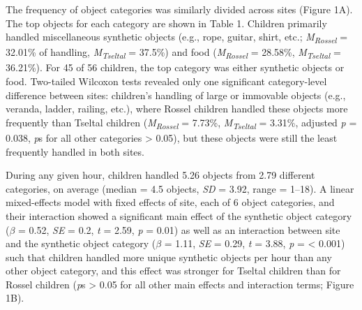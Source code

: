 \documentclass[10pt, letterpaper]{article}
\begin{document}
The frequency of object categories was similarly divided across sites
(Figure 1A). The top objects for each category are shown in Table 1.
Children primarily handled miscellaneous synthetic objects (e.g., rope,
guitar, shirt, etc.; \emph{M}\textsubscript{\emph{Rossel}} = 32.01\% of
handling, \emph{M}\textsubscript{\emph{Tseltal}} = 37.5\%) and food
(\emph{M}\textsubscript{\emph{Rossel}} = 28.58\%,
\emph{M}\textsubscript{\emph{Tseltal}} = 36.21\%). For 45 of 56
children, the top category was either synthetic objects or food.
Two-tailed Wilcoxon tests revealed only one significant category-level
difference between sites: children's handling of large or immovable
objects (e.g., veranda, ladder, railing, etc.), where Rossel children
handled these objects more frequently than Tseltal children
(\emph{M}\textsubscript{\emph{Rossel}} = 7.73\%,
\emph{M}\textsubscript{\emph{Tseltal}} = 3.31\%, adjusted \emph{p} =
0.038, \emph{p}s for all other categories \textgreater{} 0.05), but
these objects were still the least frequently handled in both sites.

During any given hour, children handled 5.26 objects from 2.79 different
categories, on average (median = 4.5 objects, \emph{SD} = 3.92, range =
1--18). A linear mixed-effects model with fixed effects of site, each of
6 object categories, and their interaction showed a significant main
effect of the synthetic object category (\(\beta\) = 0.52, \emph{SE} =
0.2, \emph{t} = 2.59, \emph{p} = 0.01) as well as an interaction between
site and the synthetic object category (\(\beta\) = 1.11, \emph{SE} =
0.29, \emph{t} = 3.88, \emph{p} = \textless{} 0.001) such that children
handled more unique synthetic objects per hour than any other object
category, and this effect was stronger for Tseltal children than for
Rossel children (\emph{p}s \textgreater{} 0.05 for all other main
effects and interaction terms; Figure 1B).
\end{document}
